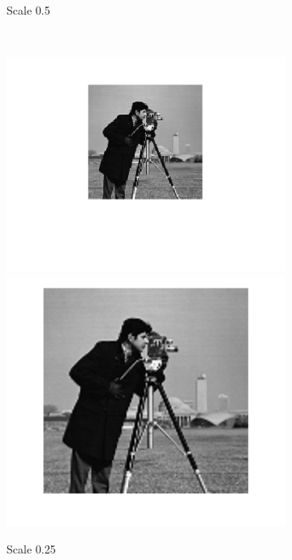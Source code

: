 \documentclass{article}
\begin{document}
\begin{figure}[h!]
\begin{subfigure}[t]{0.3\textwidth}
		\caption{Scale 0.5}
	\end{subfigure}%
	~
	\begin{subfigure}[t]{0.3\textwidth}
		\centering
		\includegraphics[width=\linewidth]{./output_images/DOWN_no_anti-alias_cubic_scale_0_250000.png}
		\includegraphics[width=\linewidth]{./output_images/UP_no_anti-alias_cubic_scale_0_250000.png}
		\caption{Scale 0.25}
	\end{subfigure}
	~
	\begin{subfigure}[t]{0.3\textwidth}
		\centering

\end{subfigure}
\end{figure}
\end{document}
